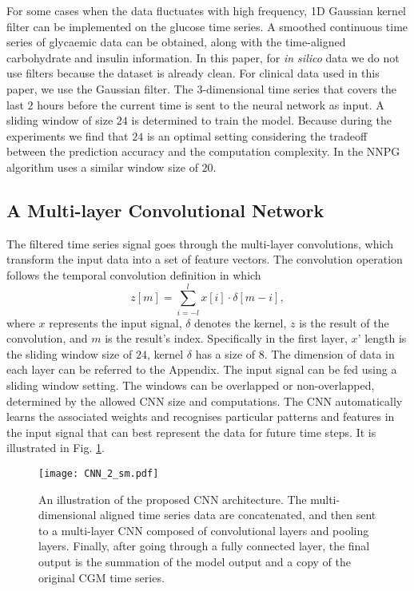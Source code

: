 \documentclass[a4paper, 10 pt, twocolumn]{IEEEtran}
\begin{document}
For some cases when the data fluctuates with high frequency, 1D Gaussian kernel filter {can be implemented on the glucose time series. A smoothed continuous time series of glycaemic data can be obtained, along with} the
time-aligned carbohydrate and insulin information.
 In this paper, for \emph{in silico} data we do not use filters  because the dataset is already clean. For clinical data used in this paper, we use the Gaussian filter. The 3-dimensional time series that covers the last
 $2$ hours before the current time is sent to the neural network as input. A sliding window of size $24$ is determined to train the model.  {Because during the experiments we find that $24$ is an optimal setting
 considering the tradeoff between the prediction accuracy and the computation complexity. In \cite{perez-ArtiNN2010} the NNPG algorithm uses a similar window size of $20$. }


\subsection{A Multi-layer Convolutional Network}

The filtered time series signal goes through the multi-layer convolutions,  {which transform} the input data into a set of feature vectors. The convolution operation follows the temporal convolution definition in which
\begin{equation}\label{eq:conv}
  z[m] = \sum_{i = -l}^{l} x[i] \cdot \delta[m-i],
\end{equation}
where $x$ represents the input signal, $\delta$ denotes the kernel,  {$z$ is the result of the convolution, and $m$ is the result's index. Specifically in the first layer, $x$' length is the sliding window size of $24$,
kernel $\delta$ has a size of $8$.  The dimension of data in each layer can be referred to the Appendix.}
The input signal can be fed
using a sliding window setting. The windows can be overlapped or non-overlapped, determined by the allowed CNN size and computations. The CNN automatically learns the associated weights and recognises particular patterns
and features in the input signal that can best represent the data for future time steps.
It is illustrated in Fig. \ref{fig:cnn_1}.


  \begin{figure}[h]
  \texttt{[image: CNN\_2\_sm.pdf]} %
  \centering
  \caption{An illustration of the proposed CNN architecture. The multi-dimensional aligned time series data are concatenated, and then sent to a multi-layer CNN composed of convolutional layers and pooling layers.
  Finally, after going through a fully connected layer, the final output is the summation of the model output and a copy of the original CGM time series.  }\label{fig:cnn_1}
  \centering
 \end{figure}
\end{document}

